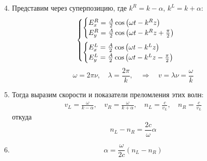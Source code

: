 \begin{frame}
	\begin{enumerate} 
	\setcounter{enumi}{3}
	\item
	Представим через суперпозицию, где $k^R=k-\alpha$, $k^L=k+\alpha$:
	\begin{gather*}
		\begin{cases}
		\begin{cases} 
			E_x^R = \frac{A}{2}
				\cos\left(
					\omega t - k^Rz
					\right)
			\\
			E_y^R = \frac{A}{2}
				\cos\left(
					\omega t - k^Rz +\frac{\pi}{2}
					\right)
		\end{cases}\vspace{0.5em}\\
		\begin{cases} 
			E_x^L = \frac{A}{2}
				\cos\left(
					\omega t - k^Lz
					\right)
			\\
			E_y^L = \frac{A}{2}
				\cos\left(
					\omega t - k^Lz -\frac{\pi}{2}
					\right)
		\end{cases}			
		\end{cases}
	\end{gather*}
	\begin{equation*}
		\omega=2\pi\nu,\quad
		\lambda=\frac{2\pi}{k},\quad\Rightarrow\quad
		v=\lambda\nu=\frac{\omega}{k}
	\end{equation*}
	\item
	Тогда выразим скорости и показатели преломления этих волн:
\begin{gather*}
	v_L=\frac{\omega}{k-\alpha},
	\quad
	v_R=\frac{\omega}{k+\alpha},
	\quad
	n_L=\frac{c}{v_L},
	\quad
	n_R=\frac{c}{v_L}
\end{gather*}
откуда 
\begin{equation*}
	n_L-n_R=\frac{2c}{\omega}\alpha
\end{equation*}
\item
\begin{equation*}
	\alpha=\frac{\omega}{2c}(n_L-n_R)
\end{equation*}
\end{enumerate} 
\end{frame}